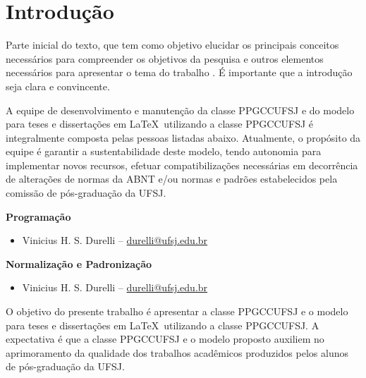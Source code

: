 \chapter[Introdução]{Introdução}

Parte inicial do texto, que tem como objetivo elucidar os principais conceitos necessários para compreender os objetivos da pesquisa e outros elementos necessários para apresentar o tema do trabalho \citep{the_craft_of_research}. É importante que a introdução seja clara e convincente. 

A equipe de desenvolvimento e manutenção da classe PPGCCUFSJ e do modelo para teses e dissertações em \LaTeX\ utilizando a classe PPGCCUFSJ é integralmente composta pelas pessoas listadas abaixo. Atualmente, o propósito da equipe é garantir a sustentabilidade deste modelo, tendo autonomia para implementar novos recursos, efetuar compatibilizações necessárias em decorrência de alterações de normas da ABNT e/ou normas e padrões estabelecidos pela comissão de pós-graduação da UFSJ. 

\textbf{Programação}

\begin{itemize}
	\item Vinicius H. S. Durelli -- \url{durelli@ufsj.edu.br}
\end{itemize}

\textbf{Normalização e Padronização}

\begin{itemize}
	\item Vinicius H. S. Durelli -- \url{durelli@ufsj.edu.br}
\end{itemize}
	
O objetivo do presente trabalho é apresentar a classe PPGCCUFSJ e o modelo para teses e dissertações em \LaTeX\ utilizando a classe PPGCCUFSJ. 
A expectativa é que a classe PPGCCUFSJ e o modelo proposto auxiliem no aprimoramento da qualidade dos trabalhos acadêmicos produzidos pelos alunos de pós-graduação da UFSJ.
	
